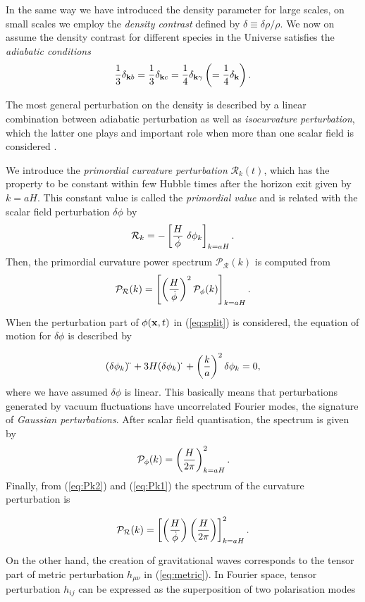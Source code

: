 \documentclass{rmaa}
\def\beq{\begin{equation}}
\def\eeq{\end{equation}}
\def\cal{\mathcal}
\begin{document}
In the same way we have introduced the density parameter for large scales, on small scales
we employ the \textit{density contrast} defined by $\delta \equiv \delta \rho / \rho$.
We now on assume the density contrast for different species in the Universe satisfies the 
\textit{adiabatic conditions}
 \beq
 {1 \over 3}\delta_{{\bf k} b}={1 \over 3}\delta_{{\bf k} c}={1 \over 4}\delta_{{\bf k} \gamma}
 \left( ={1 \over 4}\delta_{{\bf k} } \right).
 \eeq 

\noindent
The most general perturbation on the density is described by a linear combination between adiabatic
perturbation as well as \textit{isocurvature perturbation}, which the latter one plays and important role 
when more than one scalar field is considered  \citep{LiddleLyth}.


We introduce the \textit{primordial curvature perturbation} $\mathcal{R}_k(t)$, which has the property 
to be constant within few Hubble times after the horizon exit given by $k=aH$.  
This constant value is called the
\textit{primordial value} and is related with the scalar field perturbation $\delta \phi$ by
\beq
\mathcal{R}_k=-\left[ {H \over \dot \phi}\,\, \delta \phi_k \right]_{k=aH}.
\eeq
%
\noindent
 Then, the  primordial curvature power spectrum $\cal P_{\cal R}(k)$ is computed from
 \beq\label{eq:Pk1}
 \cal P_{\cal R}(k)=\left[\left({H \over \dot \phi} \right)^2 \cal P_{\phi}(k) \right]_{k=aH}.
 \eeq
 
 \noindent
 When the perturbation part of $\phi({\bf x},t)$ in (\ref{eq:split}) is considered, 
the equation of motion for $\delta \phi$ is described by

\beq
(\delta \phi_k)\ddot \,\,+3 H (\delta \phi_k)\dot \,\,+\left({k \over a}\right)^2 \delta \phi_k=0,
\eeq
%
where we have assumed $\delta \phi$ is linear. This basically means that perturbations generated by
vacuum fluctuations have uncorrelated Fourier modes, the signature of \textit{Gaussian perturbations}. 
%
After scalar field quantisation, the spectrum is given by
%
\beq\label{eq:Pk2}
\cal P_{\phi}(k)=\left( {H \over 2\pi }\right)^2_{k=aH}.
\eeq
%
Finally, from (\ref{eq:Pk2}) and (\ref{eq:Pk1}) the spectrum of the curvature perturbation is 

\begin{equation}
\cal P_{\cal R}(k) = \left[ \left({H \over \dot \phi}\right) \left({H \over 2 \pi}\right)\right]^2_{k =
a H} .
\end{equation}

On the other hand, the creation of gravitational waves corresponds to the tensor 
part of metric perturbation $h_{\mu \nu}$ in (\ref{eq:metric}). In Fourier space, 
tensor perturbation $h_{ij}$ can be expressed as the superposition of two polarisation modes
\end{document}
